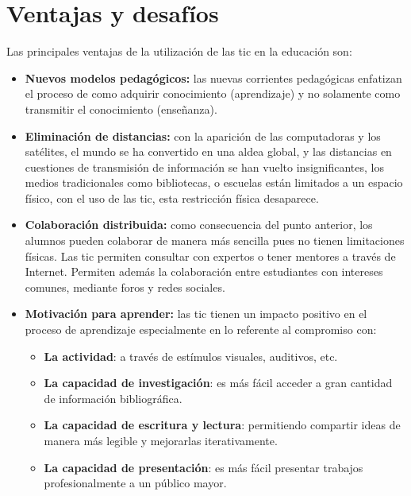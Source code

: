 \section{Ventajas y desafíos}
\label{sec:tics_ventajas}

Las principales ventajas de la utilización de las \Gls{tic} en la educación son:

\begin{itemize}

\item \textbf{Nuevos modelos pedagógicos:} las nuevas corrientes pedagógicas
    enfatizan el proceso de como adquirir conocimiento (aprendizaje) y no
    solamente como transmitir el conocimiento
    (enseñanza)\cite{guenaga2013serious}.

\item \textbf{Eliminación de distancias:} con la aparición de las computadoras y
    los satélites,  el mundo se ha convertido en una aldea global, y las
    distancias en cuestiones de transmisión de información se han vuelto
    insignificantes\cite{mohammed2013information},  los medios tradicionales
    como bibliotecas, o escuelas están limitados a un espacio  físico, con el
    uso de las \Gls{tic}, esta restricción física
    desaparece\cite{tinio:ict,punie:ict}.

\item \textbf{Colaboración distribuida:} como consecuencia del punto anterior,
    los alumnos pueden colaborar de manera más sencilla pues no tienen
    limitaciones físicas. Las \gls{tic} permiten consultar con expertos o tener
    mentores a través de Internet. Permiten además la colaboración entre
    estudiantes con intereses comunes, mediante foros y redes
    sociales\cite{unesco:ict}.

\item \textbf{Motivación para aprender:} las \Gls{tic} tienen un impacto
    positivo en el proceso de aprendizaje especialmente en lo referente al
    compromiso
    con\cite{passey2004motivational,egenfeldt2007third,martin2008modelo}:
	    
    \begin{itemize}
    \item \textbf{La actividad}: a través de estímulos visuales, auditivos, etc.
    \item \textbf{La capacidad de investigación}: es más fácil acceder a gran cantidad de
        información bibliográfica.
    \item \textbf{La capacidad de escritura y lectura}: permitiendo compartir  ideas de
        manera más legible y mejorarlas iterativamente.
    \item \textbf{La capacidad de presentación}: es más fácil presentar trabajos
        profesionalmente a un público mayor.
    \end{itemize}
	    

\end{itemize}
